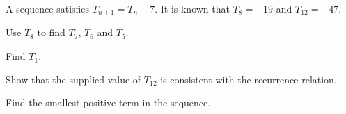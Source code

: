  A sequence satisfies $T_{n+1}=T_n-7$. It is known that $T_8=-19$ and $T_{12}=-47$.
\begin{subparts}
  \item Use $T_8$ to find $T_7$, $T_6$ and $T_5$.
  \item Find $T_1$.
  \item Show that the supplied value of $T_{12}$ is consistent with the recurrence relation.
  \item Find the smallest positive term in the sequence.
\end{subparts}
